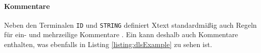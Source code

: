     

    \paragraph*{Kommentare}
    Neben den Terminalen \texttt{ID} und \texttt{STRING} definiert Xtext standardmäßig auch Regeln für ein- und mehrzeilige Kommentare
    \cite[Kapitel "`Common Terminals"']{xtext:documentation}.
    Ein {\classificationModel} kann deshalb auch Kommentare enthalten,
    was ebenfalls in Listing \ref{listing:dlsExample} zu sehen ist.

